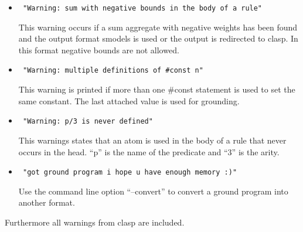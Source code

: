 \documentclass[a4paper,10pt]{article}
\begin{document}
\begin{itemize}
 \item 
\begin{verbatim}
 "Warning: sum with negative bounds in the body of a rule"
\end{verbatim}
This warning occurs if a sum aggregate with negative weights has been found and the output format smodels is used or the output is redirected to clasp. In this format negative bounds are not allowed.
 \item 
\begin{verbatim}
 "Warning: multiple definitions of #const n"
\end{verbatim}
This warning is printed if more than one \#const statement is used to set the same constant.
The last attached value is used for grounding.
\item
\begin{verbatim}
 "Warning: p/3 is never defined"
\end{verbatim}
This warnings states that an atom is used in the body of a rule that never occurs in the head.
``p'' is the name of the predicate and ``3'' is the arity.
\item
\begin{verbatim}
 "got ground program i hope u have enough memory :)"
\end{verbatim}
Use the command line option ``--convert'' to convert a ground program into another format.

\end{itemize}
Furthermore all warnings from clasp are included.
\end{document}
